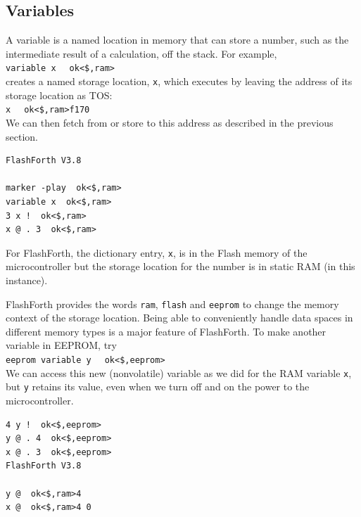 \documentclass[12pt,a4paper]{article}
\begin{document}
\subsection{Variables}
\label{sec:variables}
%
A variable is a named location in memory that can store a number,
such as the intermediate result of a calculation, off the stack.
For example, \vspace{7pt} \\
\verb?variable x ? \fbox{$\hookleftarrow$} \verb! ok<$,ram>! \vspace{7pt} \\
creates a named storage location, \verb!x!, which executes by leaving the address
of its storage location as TOS: \vspace{7pt} \\
\verb?x ? \fbox{$\hookleftarrow$} \verb! ok<$,ram>f170! \vspace{7pt} \\
We can then fetch from or store to this address as described in the previous section.
\begin{verbatim}
FlashForth V3.8

marker -play  ok<$,ram>
variable x  ok<$,ram>
3 x !  ok<$,ram>
x @ . 3  ok<$,ram>
\end{verbatim}
For FlashForth, the dictionary entry, \verb!x!, 
is in the Flash memory of the microcontroller but the
storage location for the number is in static RAM (in this instance).

\medskip
FlashForth provides the words \verb!ram!, \verb!flash! and \verb!eeprom!
to change the memory context of the storage location.
Being able to conveniently handle data spaces in different
memory types is a major feature of FlashForth.
To make another variable in EEPROM, try \vspace{7pt} \\
\verb?eeprom variable y ? \fbox{$\hookleftarrow$} \verb! ok<$,eeprom>! \vspace{7pt} \\
We can access this new (nonvolatile) variable as we did for the RAM variable \verb!x!,
but \verb!y! retains its value, even when we turn off and on the power to the microcontroller.
\begin{verbatim}
4 y !  ok<$,eeprom>
y @ . 4  ok<$,eeprom>
x @ . 3  ok<$,eeprom>
FlashForth V3.8

y @  ok<$,ram>4 
x @  ok<$,ram>4 0 
\end{verbatim}
\end{document}
